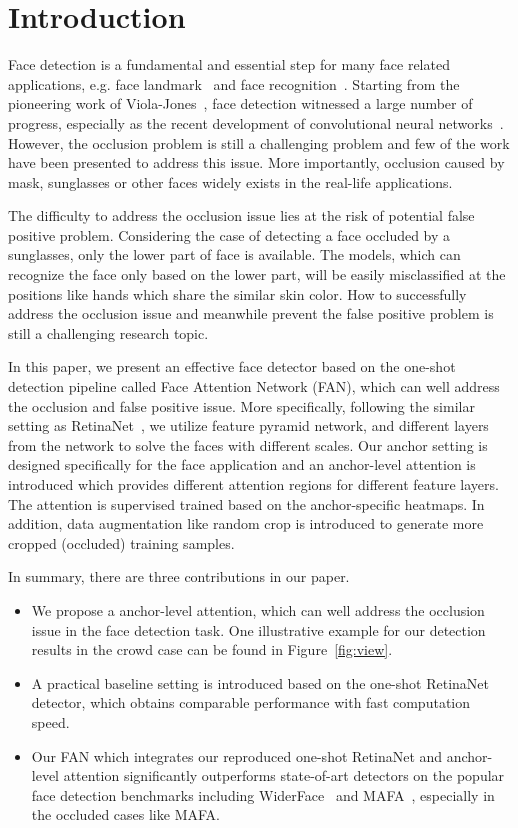 \documentclass[10pt,twocolumn,letterpaper]{article}
\begin{document}
\section{Introduction}

Face detection is a fundamental and essential step for many face related applications, e.g. face landmark~\cite{xiong2013supervised, zhu2016face} and face recognition~\cite{parkhi2015deep,schroff2015facenet,zhu2015high}. Starting from the pioneering work of Viola-Jones~\cite{viola2004robust}, face detection witnessed a large number of progress, especially as the recent development of convolutional neural networks~\cite{He2015}. However, the occlusion problem is still a challenging problem and few of the work have been presented to address this issue. More importantly, occlusion caused by mask, sunglasses or other faces widely exists in the real-life applications. 

The difficulty to address the occlusion issue lies at the risk of potential false positive problem. Considering the case of detecting a face occluded by a sunglasses, only the lower part of face is available. The models, which can recognize the face only based on the lower part, will be easily misclassified at the positions like hands which share the similar skin color. How to successfully address the occlusion issue and meanwhile prevent the false positive problem is still a challenging research topic. 


In this paper, we present an effective face detector based on the one-shot detection pipeline called Face Attention Network (FAN), which can well address the occlusion and false positive issue. More specifically, following the similar setting as RetinaNet~\cite{lin2017focal}, we utilize feature pyramid network, and different layers from the network to solve the faces with different scales. Our anchor setting is designed specifically for the face application and an anchor-level attention is introduced which provides different attention regions for different feature layers. The attention is supervised trained based on the anchor-specific heatmaps. In addition, data augmentation like random crop is introduced to generate more cropped (occluded) training samples.


In summary, there are three contributions in our paper. 
\begin{itemize}
\item We propose a anchor-level attention, which can well address the occlusion issue in the face detection task. One illustrative example for our detection results in the crowd case can be found in Figure~\ref{fig:view}.
\item A practical baseline setting is introduced based on the one-shot RetinaNet detector, which obtains comparable performance with fast computation speed. 
\item Our FAN which integrates our reproduced one-shot RetinaNet and anchor-level attention significantly outperforms state-of-art detectors on the popular face detection benchmarks including WiderFace~\cite{yang2016wider} and MAFA~\cite{Ge_2017_CVPR}, especially in the occluded cases like MAFA.
\end{itemize}
 
\end{document}
